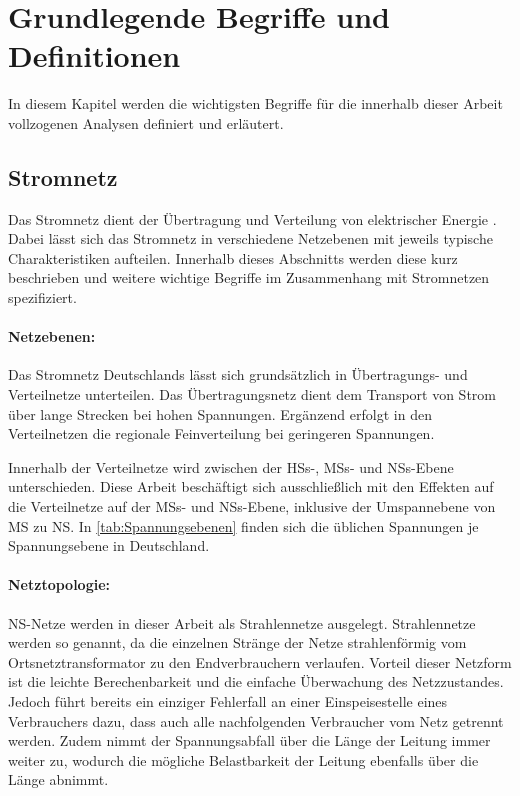 \section{Grundlegende Begriffe und Definitionen}\label{chap:base_theo}

In diesem Kapitel werden die wichtigsten Begriffe für die innerhalb dieser Arbeit vollzogenen Analysen definiert und erläutert.


\subsection{Stromnetz}\label{chap:theo_grid}

Das Stromnetz dient der Übertragung und Verteilung von elektrischer Energie \cite{Paschotta2020}.
Dabei lässt sich das Stromnetz in verschiedene Netzebenen mit jeweils typische Charakteristiken aufteilen.
Innerhalb dieses Abschnitts werden diese kurz beschrieben und weitere wichtige Begriffe im Zusammenhang mit Stromnetzen spezifiziert.


\paragraph{Netzebenen:}

Das Stromnetz Deutschlands lässt sich grundsätzlich in Übertragungs- und Verteilnetze unterteilen.
Das Übertragungsnetz dient dem Transport von Strom über lange Strecken bei hohen Spannungen.
Ergänzend erfolgt in den Verteilnetzen die regionale Feinverteilung bei geringeren Spannungen. \cite{Agora2019}\medskip

Innerhalb der Verteilnetze wird zwischen der \glspl{HS}-, \glspl{MS}- und \glspl{NS}-Ebene unterschieden.
Diese Arbeit beschäftigt sich ausschließlich mit den Effekten auf die Verteilnetze auf der \glspl{MS}- und \glspl{NS}-Ebene, inklusive der Umspannebene von \gls{MS} zu \gls{NS}.
In \autoref{tab:Spannungsebenen} finden sich die üblichen Spannungen je Spannungsebene in Deutschland.




\paragraph{Netztopologie:}

\gls{NS}-Netze werden in dieser Arbeit als Strahlennetze ausgelegt.
Strahlennetze werden so genannt, da die einzelnen Stränge der Netze strahlenförmig vom Ortsnetztransformator zu den Endverbrauchern verlaufen.
Vorteil dieser Netzform ist die leichte Berechenbarkeit und die einfache Überwachung des Netzzustandes.
Jedoch führt bereits ein einziger Fehlerfall an einer Einspeisestelle eines Verbrauchers dazu, dass auch alle nachfolgenden Verbraucher vom Netz getrennt werden.
Zudem nimmt der Spannungsabfall über die Länge der Leitung immer weiter zu, wodurch die mögliche Belastbarkeit der Leitung ebenfalls über die Länge abnimmt. \cite{Agora2019} \cite{WNG2020}\medskip

